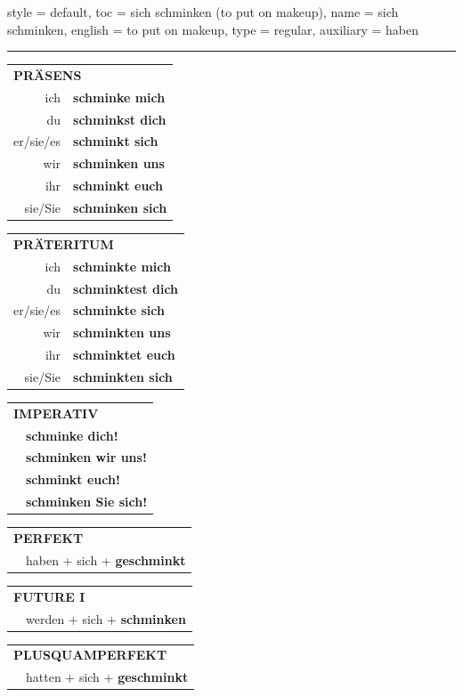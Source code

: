\begin{verbentry}{
  style = {default},
  toc = {sich schminken (to put on makeup)},
  name = {sich schminken},
  english = {to put on makeup},
  type = {regular},
  auxiliary = {haben}
}


\vspace{5pt}
\hrule
\vspace{5pt}

\begin{tabular}{rl}
\multicolumn{2}{l}{\textbf{PRÄSENS}}\\
ich & \textbf{schminke mich}\\
du & \textbf{schminkst dich}\\
er/sie/es & \textbf{schminkt sich}\\
wir & \textbf{schminken uns}\\
ihr & \textbf{schminkt euch}\\
sie/Sie & \textbf{schminken sich}\\
\end{tabular}
\hfill
\begin{tabular}{rl}
\multicolumn{2}{l}{\textbf{PRÄTERITUM}}\\
ich & \textbf{schminkte mich}\\
du & \textbf{schminktest dich}\\
er/sie/es & \textbf{schminkte sich}\\
wir & \textbf{schminkten uns}\\
ihr & \textbf{schminktet euch}\\
sie/Sie & \textbf{schminkten sich}\\
\end{tabular}
\hfill
\begin{tabular}{rl}
\multicolumn{2}{l}{\textbf{IMPERATIV}}\\
& \textbf{schminke dich!}\\
& \textbf{schminken wir uns!}\\
& \textbf{schminkt euch!}\\
& \textbf{schminken Sie sich!}\\
\end{tabular}

\vspace{10pt}

\begin{tabular}{rl}
\multicolumn{2}{l}{\textbf{PERFEKT}}\\
& haben + sich + \textbf{geschminkt}\\
\end{tabular}
\hfill
\begin{tabular}{rl}
\multicolumn{2}{l}{\textbf{FUTURE I}}\\
& werden + sich + \textbf{schminken}\\
\end{tabular}
\hfill
\begin{tabular}{rl}
\multicolumn{2}{l}{\textbf{PLUSQUAMPERFEKT}}\\
& hatten + sich + \textbf{geschminkt}\\
\end{tabular}


\end{verbentry}
